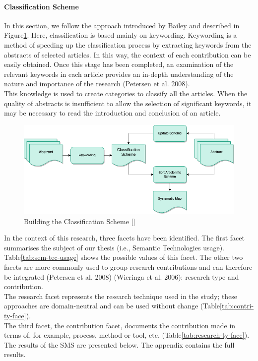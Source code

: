             
            \paragraph{Classification Scheme}
            In this section, we follow the approach introduced by Bailey and described in Figure\ref{fig:BuildClassSchem}. Here, classification is based mainly on keywording. Keywording is a method of speeding up the classification process by extracting keywords from the abstracts of selected articles. In this way, the context of each contribution can be easily obtained. Once this stage has been completed, an examination of the relevant keywords in each article provides an in-depth understanding of the nature and importance of the research (Petersen et al. 2008). \\
            This knowledge is used to create categories to classify all the articles. When the quality of abstracts is insufficient to allow the selection of significant keywords, it may be necessary to read the introduction and conclusion of an article.

            \begin{figure}[H]
                \centering
                \includegraphics[scale=0.6]{images/RelatedWork-Build-Class-Schem.drawio.png}  \caption{\label{fig:BuildClassSchem}  Building the Classification Scheme []}
            \end{figure}

           In the context of this research, three facets have been identified. The first facet summarises the subject of our thesis (i.e., Semantic Technologies usage). Table\ref{tab:sem-tec-usage} shows the possible values of this facet. The other two facets are more commonly used to group research contributions and can therefore be integrated (Petersen et al. 2008) (Wieringa et al. 2006): research type and contribution.\\
            The research facet represents the research technique used in the study; these approaches are domain-neutral and can be used without change (Table\ref{tab:contri-ty-face}).\\
            The third facet, the contribution facet, documents the contribution made in terms of, for example, process, method or tool, etc. (Table\ref{tab:research-ty-face}).\\
            The results of the SMS are presented below. The appendix contains the full results.

